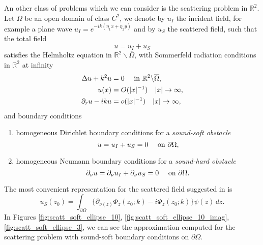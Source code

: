 \documentclass[10pt, a4paper]{article} %
\numberwithin{equation}{section}
\theoremstyle{definition}
\theoremstyle{plain}
\theoremstyle{plain}
\theoremstyle{plain}
\theoremstyle{plain}
\theoremstyle{plain}
\theoremstyle{plain}
\theoremstyle{plain}
\theoremstyle{plain}
\newcommand{\upin}{\textup{ in }}
\newcommand{\upon}{\textup{ on }}
\begin{document}
\par
An other class of problems which we can consider is the scattering problem in $\mathbb{R}^2$.
Let $\Omega$ be an open domain of class $C^2$, we denote by $u_I$ the incident field, 
for example a plane wave $u_I = e^{-ik(\eta_1 x + \eta_2 y)}$ and by $u_S$ the scattered field, such that the
total field
\begin{equation}
 u=u_I + u_S\label{eq:def-total-fiels} 
\end{equation}
satisfies the Helmholtz equation in 
$\mathbb{R}^2\backslash\overline{\Omega}$, with Sommerfeld radiation 
conditions in $\mathbb{R}^2$ at infinity
\begin{align}
 \Delta u + k^2 u &= 0 \quad \upin \mathbb{R}^2\backslash\overline{\Omega},\\
 u(x)&=O(|x|^{-1}) \quad |x|\to \infty,\\
 \partial_r u - ik u &=o(|x|^{-1})\quad |x|\to \infty,   
\end{align}
and boundary conditions
\begin{enumerate}
 \item homogeneous Dirichlet boundary conditions for a \emph{sound-soft obstacle}
 \begin{equation}
  u = u_I + u_S= 0\quad\upon \partial \Omega,
 \end{equation}
 \item homogeneous Neumann boundary conditions for a \emph{sound-hard obstacle}
 \begin{equation}
  \partial_\nu u = \partial_\nu u_I + \partial_\nu u_S= 0\quad\upon \partial \Omega.
 \end{equation}
\end{enumerate}
The most convenient representation for the scattered field suggested in \cite{chen-zhou:book} is
\begin{equation}
 u_S(z_0)=\int_{\partial \Omega}\Big\{\partial_{\nu(z)}\Phi_z(z_0;k) -i\Phi_z(z_0;k)\Big\}\psi(z)\,dz.
\end{equation}
In Figures \ref{fig:scatt_soft_ellipse_10}, \ref{fig:scatt_soft_ellipse_10_imag}, \ref{fig:scatt_soft_ellipse_3}, 
we can see the approximation computed for the scattering problem with sound-soft boundary conditions 
on $\partial\Omega$.
\end{document}
